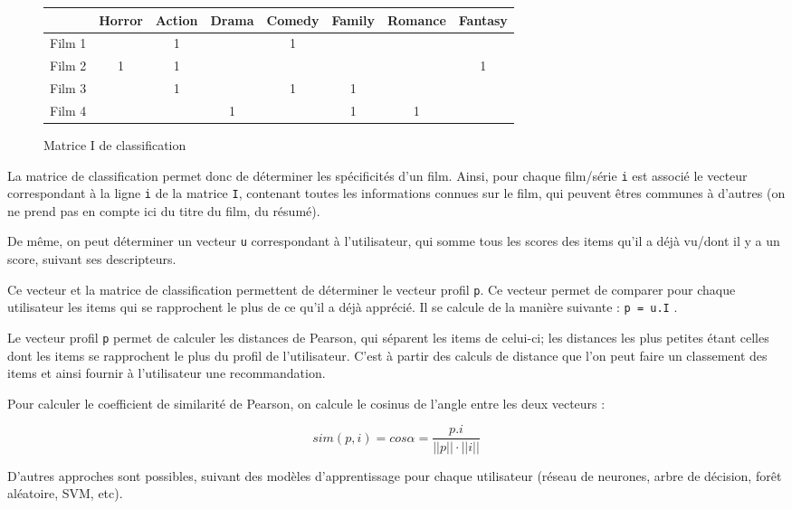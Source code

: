 \documentclass{article}
\begin{document}
\begin{figure}[!h]
\begin{center}
\begin{tabular}{|c|c|c|c|c|c|c|c|}
\hline
&Horror&Action&Drama&Comedy&Family&Romance&Fantasy\\
\hline
Film 1&&1&&1&&&\\
\hline
Film 2&1&1&&&&&1\\
\hline
Film 3&&1&&1&1&&\\
\hline
Film 4&&&1&&1&1&\\
\hline
\end{tabular}
\newline\newline
\caption{ Matrice I de classification}
\end{center}
\end{figure}

La matrice de classification permet donc de déterminer les spécificités d'un film. Ainsi, pour chaque film/série \verb'i' est associé le vecteur correspondant à la ligne \verb'i' de la matrice \verb'I', contenant toutes les informations connues sur le film, qui peuvent êtres communes à d'autres (on ne prend pas en compte ici du titre du film, du résumé).

De même, on peut déterminer un vecteur \verb'u' correspondant à l'utilisateur, qui somme tous les scores des items qu'il a déjà vu/dont il y a un score, suivant ses descripteurs.

Ce vecteur et la matrice de classification permettent de déterminer le vecteur profil \verb'p'. Ce vecteur permet de comparer pour chaque utilisateur les items qui se rapprochent le plus de ce qu'il a déjà apprécié. Il se calcule de la manière suivante : \verb'p = u.I' .

Le vecteur profil \verb'p' permet de calculer les distances de Pearson, qui séparent les items de celui-ci; les distances les plus petites étant celles dont les items se rapprochent le plus du profil de l'utilisateur. C'est à partir des calculs de distance que l'on peut faire un classement des items et ainsi fournir à l'utilisateur une recommandation. 

Pour calculer le coefficient de similarité de Pearson, on calcule le cosinus de l'angle entre les deux vecteurs : 

\[sim(p,i)=cos \alpha = \frac{p.i}{||p||\cdot||i||}\]

D'autres approches sont possibles, suivant des modèles d'apprentissage pour chaque utilisateur (réseau de neurones, arbre de décision, forêt aléatoire, SVM, etc).
\end{document}
